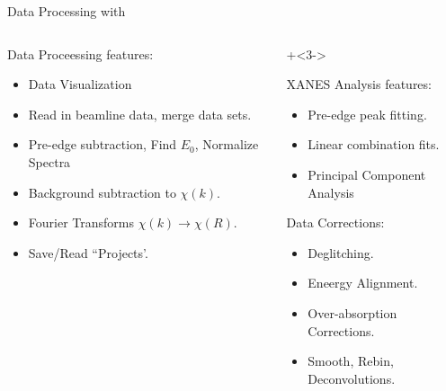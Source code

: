 \begin{slide}{Data Processing with {\xasviewer}  }
\begin{cenpage}{135mm}
{{\begin{columns}[T]
\begin{column}{65mm}
      Data Proceessing  features:      
      \begin{itemize}
      \item  Data Visualization
      \item  Read in beamline data, merge data sets.
      \item  Pre-edge subtraction, Find $E_0$, Normalize Spectra
      \item  Background subtraction  to $\chi(k)$.
      \item  Fourier Transforms  $\chi(k) \rightarrow \chi(R)$.
      \item  Save/Read ``Projects'.
      \end{itemize}
    \vfill

  \end{column}

    \begin{column}{65mm}
   \onslide+<3->

   XANES Analysis features:
   \begin{itemize}
   \item  Pre-edge peak fitting.
   \item  Linear combination fits.
   \item Principal Component Analysis
   \end{itemize}

   Data Corrections:
   \begin{itemize}
   \item  Deglitching.
   \item  Eneergy Alignment. 
   \item  Over-absorption Corrections.
   \item Smooth, Rebin, Deconvolutions.
   \end{itemize}
   
 \end{column}
\end{columns}

}}
\end{cenpage}


\end{slide}

